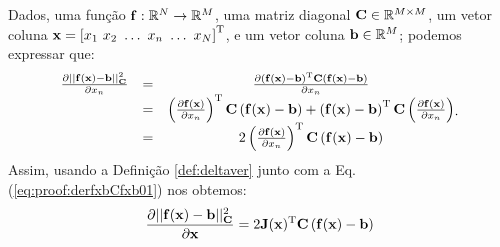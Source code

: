 \begin{myproofT}\label{proof:theo:derfxbCfxb0}
Dados,
uma função $\VECTOR{f}:\mathbb{R}^{N} \rightarrow \mathbb{R}^{M}$, 
uma matriz diagonal $\MATRIX{C}\in \mathbb{R}^{M\times M}$, 
um vetor coluna $\VECTOR{x}=\left[x_{1}~ x_{2}~ \hdots~ x_{n}~ \hdots~ x_{N}\right]^{\transpose}$, e
um vetor coluna $\VECTOR{b}\in \mathbb{R}^{M}$;
podemos expressar que:
\begin{equation}\label{eq:proof:derfxbCfxb01}
\begin{matrix}
\frac{\partial ||\VECTOR{f}(\VECTOR{x})-\VECTOR{b}||_{\MATRIX{C}}^2}{\partial x_{n}} & = &
\frac{\partial \left( \VECTOR{f}(\VECTOR{x})-\VECTOR{b}\right)^{\transpose} \MATRIX{C} \left( \VECTOR{f}(\VECTOR{x})-\VECTOR{b}\right) }{\partial x_{n}} \\
~ &= &
 \left(  \frac{\partial\VECTOR{f}(\VECTOR{x})  }{\partial x_{n}} \right)^{\transpose} \MATRIX{C} \left( \VECTOR{f}(\VECTOR{x})-\VECTOR{b}\right) +
 \left( \VECTOR{f}(\VECTOR{x})-\VECTOR{b}\right)^{\transpose} \MATRIX{C}  \left(  \frac{\partial\VECTOR{f}(\VECTOR{x})  }{\partial x_{n}} \right)\\
~ &= &
 2 \left(  \frac{\partial\VECTOR{f}(\VECTOR{x})  }{\partial x_{n}} \right)^{\transpose} \MATRIX{C} \left( \VECTOR{f}(\VECTOR{x})-\VECTOR{b}\right)
\end{matrix}.
\end{equation}
Assim, usando a Definição \ref{def:deltaver} junto com a Eq. (\ref{eq:proof:derfxbCfxb01})
nos obtemos:
\begin{equation}\label{eq:proof:derfxbCfxb02}
\frac{\partial ||\VECTOR{f}(\VECTOR{x})-\VECTOR{b}||_{\MATRIX{C}}^2}{\partial \VECTOR{x}}  = 
2 \MATRIX{J}(\VECTOR{x})^{\transpose} \MATRIX{C} \left( \VECTOR{f}(\VECTOR{x})-\VECTOR{b}\right)
\end{equation}
\end{myproofT}


